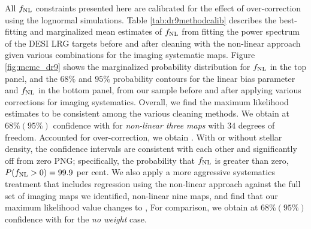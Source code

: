 All $f_{\rm NL}$ constraints presented here are calibrated for the effect of over-correction using the lognormal simulations. Table \ref{tab:dr9methodcalib} describes the best-fitting and marginalized mean estimates of $f_{\rm NL}$ from fitting the power spectrum of the DESI LRG targets before and after cleaning with the non-linear approach given various combinations for the imaging systematic maps. Figure \ref{fig:mcmc_dr9} shows the marginalized probability distribution for $f_{\rm NL}$ in the top panel, and the $68\%$ and $95\%$ probability contours for the linear bias parameter and $f_{\rm NL}$ in the bottom panel, from our sample before and after applying various corrections for imaging systematics. Overall, we find the maximum likelihood estimates to be consistent among the various cleaning methods. We obtain  at $68\%(95\%)$ confidence with  for \textit{non-linear three maps} with $34$ degrees of freedom. Accounted for over-correction, we obtain . With or without stellar density, the confidence intervals are consistent with each other and significantly off from zero PNG; specifically, the probability that $f_{\rm NL}$ is greater than zero, $P(f_{\rm NL} >0)=99.9$ per cent. We also apply a more aggressive systematics treatment that includes regression using the non-linear approach against the full set of imaging maps we identified, non-linear nine maps, and find that  our maximum
likelihood value changes  to ,   For comparison, we obtain  at $68\% (95\%)$ confidence with  for the \textit{no weight} case.

